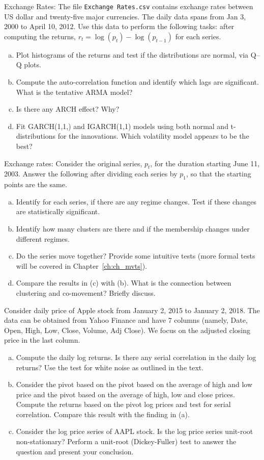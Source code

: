 \prob Exchange Rates: The file \texttt{Exchange Rates.csv} contains exchange rates between US dollar and twenty-five major currencies. The daily data spans from Jan 3, 2000 to April 10, 2012. Use this data to perform the following tasks: after computing the returns, $r_t=\log(p_t)-\log(p_{t-1})$ for each series.

\begin{enumerate}[(a)]
\item Plot histograms of the returns and test if the distributions are normal, via Q--Q plots.
\item Compute the auto-correlation function and identify which lags are significant. What is the tentative ARMA model?
\item Is there any ARCH effect? Why?
\item Fit GARCH(1,1,) and IGARCH(1,1) models using both normal and t-distributions for the innovations. Which volatility model appears to be the best? \twomedskip
\end{enumerate}


\prob Exchange rates: Consider the original series, $p_t$, for the duration starting June 11, 2003.
 Answer the following after dividing each series by $p_1$, so that the starting points are the same.
 
\begin{enumerate}[(a)]
\item Identify for each series, if there are any regime changes. Test if these changes are statistically significant.
\item Identify how many clusters are there and if the membership changes under different regimes.
\item Do the series move together? Provide some intuitive tests (more formal tests will be covered in Chapter~\ref{ch:ch_mvts}). 
\item Compare the results in (c) with (b). What is the connection between clustering and co-movement? Briefly discuss. \twomedskip
\end{enumerate}


\prob Consider daily price of Apple stock from January 2, 2015 to January 2, 2018. The data can be obtained from Yahoo Finance and have 7 columns (namely, Date, Open, High, Low, Close, Volume, Adj Close). We focus on the adjusted closing price in the last column.

\begin{enumerate}[(a)]
\item Compute the daily log returns. Is there any serial correlation in the daily log returns? Use the test for white noise as outlined in the text. 
\item Consider the pivot based on the pivot based on the average of high and low price and the pivot based on the average of high, low and close prices. Compute the returns based on the pivot log prices and test for serial correlation. Compare this result with the finding in (a). 
\item Consider the log price series of AAPL stock. Is the log price series unit-root non-stationary? Perform a unit-root (Dickey-Fuller) test to answer the question and present your conclusion. \twomedskip
\end{enumerate}


